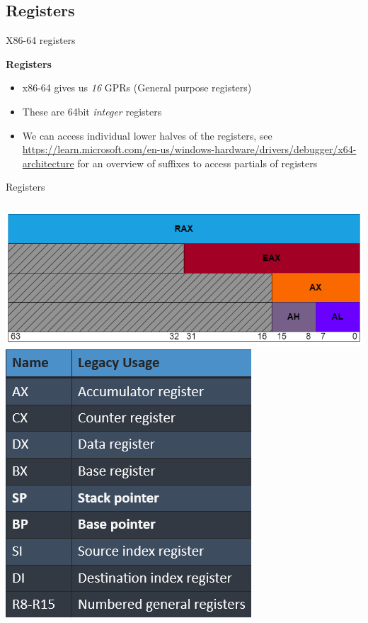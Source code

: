 \documentclass[
	11pt, %
	aspectratio=169, %
]{beamer}
\begin{document}
\subsection{Registers}
\begin{frame}{X86-64 registers}{\sectiontitle}

    \textbf{Registers}
    \begin{itemize}
        \item x86-64 gives us \textit{16} GPRs (General purpose registers)
        \item These are 64bit \textit{integer} registers
        \item We can access individual lower halves of the registers,
              see \url{https://learn.microsoft.com/en-us/windows-hardware/drivers/debugger/x64-architecture} for an overview of suffixes to access partials of registers
    \end{itemize}
\end{frame}

\begin{frame}{Registers}{\sectiontitle}
    \begin{columns}
        \includegraphics[width=\textwidth]{x64-register-layout.png}
        \includegraphics[scale=0.7]{x86-64_registers.png}
    \end{columns}
\end{frame}
\end{document}
